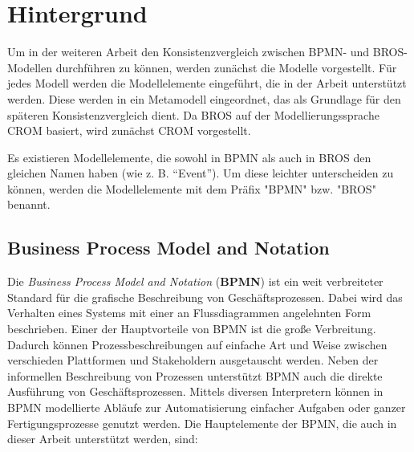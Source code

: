 \chapter{Hintergrund}
\label{chap:background}

Um in der weiteren Arbeit den Konsistenzvergleich zwischen BPMN- und BROS-Modellen durchführen zu können, werden zunächst die Modelle vorgestellt.
Für jedes Modell werden die Modellelemente eingeführt, die in der Arbeit unterstützt werden.
Diese werden in ein Metamodell eingeordnet, das als Grundlage für den späteren Konsistenzvergleich dient.
Da BROS auf der Modellierungssprache CROM basiert, wird zunächst CROM vorgestellt.

Es existieren Modellelemente, die sowohl in BPMN als auch in BROS den gleichen Namen haben (wie z. B. ``Event'').
Um diese leichter unterscheiden zu können, werden die Modellelemente mit dem Präfix "BPMN" bzw. "BROS" benannt.

\section{Business Process Model and Notation}

Die \emph{Business Process Model and Notation} (\textbf{BPMN}) ist ein weit verbreiteter Standard für die grafische Beschreibung von Geschäftsprozessen.
Dabei wird das Verhalten eines Systems mit einer an Flussdiagrammen angelehnten Form beschrieben.
Einer der Hauptvorteile von BPMN ist die große Verbreitung.
Dadurch können Prozessbeschreibungen auf einfache Art und Weise zwischen verschieden Plattformen und Stakeholdern ausgetauscht werden.
Neben der informellen Beschreibung von Prozessen unterstützt BPMN auch die direkte Ausführung von Geschäftsprozessen.
Mittels diversen Interpretern können in BPMN modellierte Abläufe zur Automatisierung einfacher Aufgaben oder ganzer Fertigungsprozesse genutzt werden.
Die Hauptelemente der BPMN, die auch in dieser Arbeit unterstützt werden, sind:

